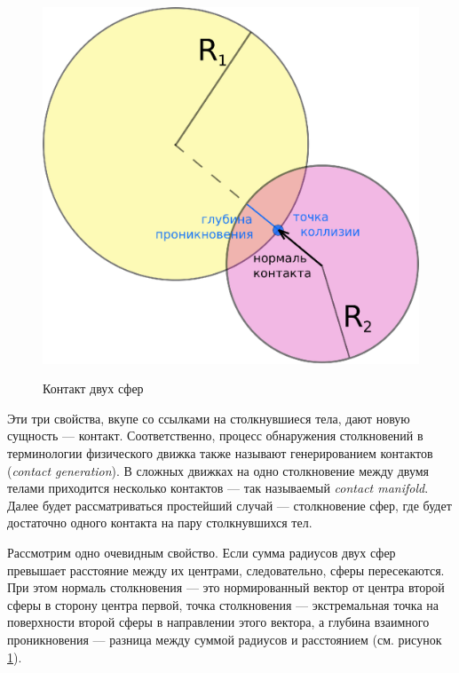 \begin{figure}[ht!]
\begin{center}
\includegraphics[scale=0.45]{./Geometry/SphereCollision.eps} \\
\caption{Контакт двух сфер}\label{SphereCollision} 
\end{center}
\end{figure}
Эти три свойства, вкупе со ссылками на столкнувшиеся тела, дают новую сущность --- контакт. Соответственно,
процесс обнаружения столкновений в терминологии физического движка также называют генерированием
контактов (\textit{contact generation}). В сложных движках на одно столкновение между двумя телами приходится несколько
контактов --- так называемый \textit{contact manifold}. Далее будет рассматриваться простейший случай --- столкновение сфер, где будет
достаточно одного контакта на пару столкнувшихся тел.

Рассмотрим одно очевидным свойство. Если сумма радиусов двух сфер превышает расстояние между их центрами, следовательно, сферы пересекаются.
При этом нормаль столкновения --- это нормированный вектор от центра второй сферы в сторону центра первой,
точка столкновения --- экстремальная точка на поверхности второй сферы в направлении этого вектора, а глубина взаимного
проникновения --- разница между суммой радиусов и расстоянием (см. рисунок \ref{SphereCollision}). %

